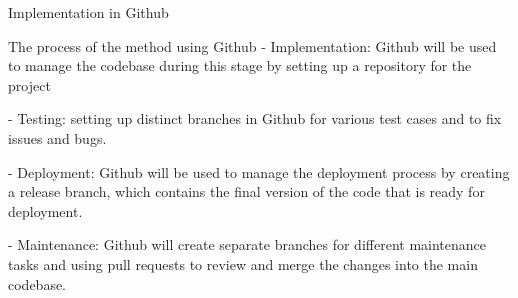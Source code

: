 \begin{frame}{Implementation in Github}
    \begin{block}{The process of the method using Github}
        - Implementation: Github will be used to manage the codebase during this stage by setting up a repository for the project

        - Testing: setting up distinct branches in Github for various test cases and to fix issues and bugs.

        - Deployment: Github will be used to manage the deployment process by creating a release branch, which contains the final version of the code that is ready for deployment.

        - Maintenance: Github will create separate branches for different maintenance tasks and using pull requests to review and merge the changes into the main codebase.
    \end{block}
\end{frame}